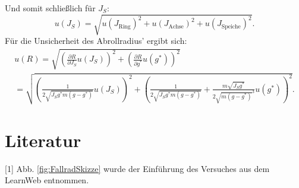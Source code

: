 \documentclass[11pt,a4paper,titlepage, ngerman]{article}
\begin{document}
	Und somit schließlich für $J_S$:
	\begin{equation*}
		u(J_S)= \sqrt{u(J_\text{Ring})^2 + u(J_\text{Achse})^2 + u(J_\text{Speiche})^2}.
	\end{equation*}
	Für die Unsicherheit des Abrollradius' ergibt sich:
	\begin{align*}
		u(R) = \sqrt{\left( \frac{\partial R}{\partial J_S}u(J_S)\right)^2 + \left(\frac{\partial R}{\partial g^{*}}u(g^{*})\right) ^2} \\
		= \sqrt{\left( \frac{1}{2\sqrt{J_S g^{*} m(g-g^{*})}}u(J_S)\right)^2 + \left(\frac{1}{2\sqrt{J_S g^{*} m(g-g^{*})}}+\frac{m\sqrt{J_S g^{*}}}{2\sqrt{m(g-g^{*})}^3} u(g^{*})\right) ^2}.
	\end{align*}
	\section*{Literatur}
	
	[1] Abb. \ref{fig:FallradSkizze} wurde der Einführung des Versuches aus dem LearnWeb entnommen.
	
\end{document}
